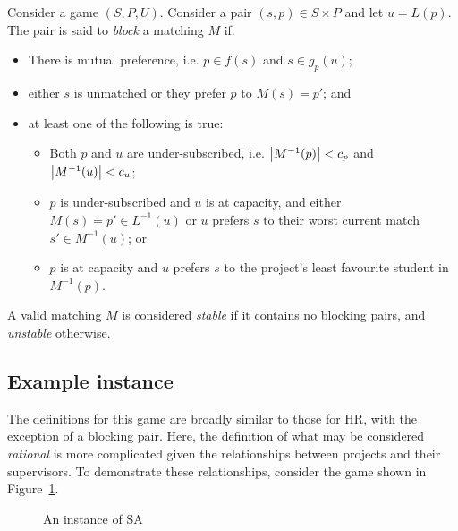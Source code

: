 \begin{definition}\label{def:sa_blocking}
    Consider a game \((S, P, U)\). Consider a pair \((s, p) \in S \times P\) and
    let \(u = L(p)\). The pair is said to \emph{block} a matching \(M\) if:

    \begin{itemize}
        \item There is mutual preference, i.e. \(p \in f(s)\) and \(s \in
            g_p(u)\);
        \item either \(s\) is unmatched or they prefer \(p\) to \(M(s) = p'\);
            and
        \item at least one of the following is true:
            \begin{itemize}
                \item Both \(p\) and \(u\) are under-subscribed, i.e.
                    \(\abs*{M^{-1}(p)} < c_p\) and \(\abs*{M^{-1}(u)} < c_u\);
                \item \(p\) is under-subscribed and \(u\) is at capacity, and
                    either \(M(s) = p' \in L^{-1}(u)\) or \(u\) prefers \(s\) to
                    their worst current match \(s' \in M^{-1}(u)\); or
                \item \(p\) is at capacity and \(u\) prefers \(s\) to the
                    project's least favourite student in \(M^{-1}(p)\).
            \end{itemize}
    \end{itemize}

    A valid matching \(M\) is considered \emph{stable} if it contains no
    blocking pairs, and \emph{unstable} otherwise.
\end{definition}

\subsection{Example instance}

The definitions for this game are broadly similar to those for HR, with the
exception of a blocking pair. Here, the definition of what may be considered
\emph{rational} is more complicated given the relationships between projects and
their supervisors. To demonstrate these relationships, consider the game shown
in Figure~\ref{fig:sa_matching}.

\begin{figure}[htbp]
    \centering
    \resizebox{\imgwidth}{!}{%
        
    }\caption{An instance of SA}\label{fig:sa_matching}
\end{figure}

